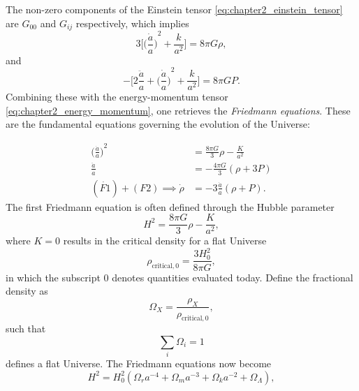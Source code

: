 The non-zero components of the Einstein tensor \cref{eq:chapter2_einstein_tensor} are \(G_{00}\) and \(G_{i j}\) respectively, which implies
%
\begin{equation}
	3\Bigg[ {\bigg(\frac{\dot{a}}{a}\bigg)}^{2} + \frac{k}{a^{2}} \Bigg]
	= 8\pi G\rho,
\end{equation}
%
and
%
\begin{equation}
	-\Bigg[ 2\frac{\ddot{a}}{a} + {\bigg(\frac{\dot{a}}{a}\bigg)}^{2} + \frac{k}{a^{2}} \Bigg]
	= 8\pi G P.
\end{equation}
%
Combining these with the energy-momentum tensor \cref{eq:chapter2_energy_momentum}, one retrieves the \emph{Friedmann equations}.
These are the fundamental equations governing the evolution of the Universe:
%
\addtocounter{equation}{-1}
%
\begin{subequations}
	\begin{align}
		{\bigg(\frac{\dot{a}}{a}\bigg)}^{2}   & = \frac{8\pi G}{3} \rho - \frac{K}{a^{2}} \tag{F1} \label{eq:chapter2_F1} \\
		\frac{\ddot{a}}{a}                    & = -\frac{4\pi G}{3}(\rho + 3P) \tag{F2}                                   \\
		(\dot{F1}) + (F2) \implies \dot{\rho} & = -3\frac{\dot{a}}{a}(\rho + P). \tag{F3}
	\end{align}
\end{subequations}
%
The first Friedmann equation is often defined through the Hubble parameter
%
\begin{equation}
	H^{2}
	= \frac{8\pi G}{3} \rho - \frac{K}{a^{2}},
\end{equation}
%
where \(K=0\) results in the critical density for a flat Universe
%
\begin{equation}
	\rho_{\text{critical},0}
	= \frac{3H_{0}^{2}}{8\pi G},
\end{equation}
%
in which the subscript \(0\) denotes quantities evaluated today.
Define the fractional density as
%
\begin{equation}
	\Omega_{X}
	= \frac{\rho_{X}}{\rho_{\text{critical},0}},
\end{equation}
%
such that
%
\begin{equation}
	\sum\limits_{i}\Omega_{i}
	= 1
\end{equation}
%
defines a flat Universe.
The Friedmann equations now become
%
\begin{equation}
	H^{2}
	= H_{0}^{2} (\Omega_{r}a^{-4} + \Omega_{m}a^{-3} + \Omega_{k}a^{-2} + \Omega_{\Lambda}),
\end{equation}
